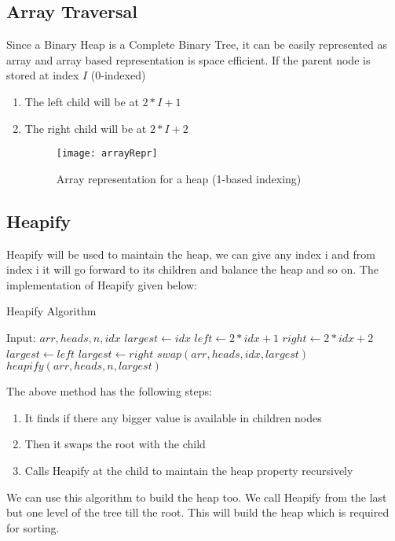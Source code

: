 \documentclass[letterpaper, 11 pt, conference]{ieeeconf}  %
\begin{document}
\subsection{Array Traversal}
Since a Binary Heap is a Complete Binary Tree, it can be easily represented as array and array based representation is space efficient. If the parent node is stored at index $I$ (0-indexed)
\begin{enumerate}
\item The left child will be at $2 * I + 1$
\item The right child will be at $2 * I + 2$

\begin{figure}[H]
\texttt{[image: arrayRepr]}
\caption{Array representation for a heap (1-based indexing)}
\end{figure}

\end{enumerate}
\subsection{Heapify}
Heapify will be used to maintain the heap, we can give any index i and from index i it will go forward to its children and balance the heap and so on. The implementation of Heapify given below:

\begin{algorithm}[H]
\caption{Heapify Algorithm}\label{alg:heapify}
\begin{algorithmic}
\State Input: $arr, heads, n, idx$
\State $largest \gets idx$
\State $left \gets 2*idx + 1$
\State $right \gets 2*idx + 2$
	\State $largest \gets left$
\EndIf
{}
	\State $largest \gets right$
\EndIf
{}
	\State $swap(arr, heads, idx, largest)$
	\State $heapify(arr, heads, n, largest)$
\EndIf
\end{algorithmic}
\end{algorithm}

The above method has the following steps:
\begin{enumerate}
\item It finds if there any bigger value is available in children nodes
\item Then it swaps the root with the child
\item Calls Heapify at the child to maintain the heap property recursively
\end{enumerate}
We can use this algorithm to build the heap too. We call Heapify from the last but one level of the tree till the root. This will build the heap which is required for sorting.
\end{document}
